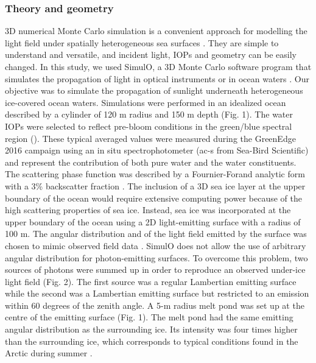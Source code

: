 \subsubsection{Theory and geometry}

3D numerical Monte Carlo simulation is a convenient approach for modelling the light field under spatially heterogeneous sea surfaces \citep{Mobley_ocean_optics_book, Petrich2012, Katlein2014, Katlein2016}. They are simple to understand and versatile, and incident light, IOPs and geometry can be easily changed. In this study, we used SimulO, a 3D Monte Carlo software program that simulates the propagation of light in optical instruments or in ocean waters \citep{Leymarie2010}. Our objective was to simulate the propagation of sunlight underneath heterogeneous ice-covered ocean waters. Simulations were performed in an idealized ocean described by a cylinder of 120 m radius and 150 m depth (Fig. 1). The water IOPs were selected to reflect pre-bloom conditions in the green/blue spectral region (\DIFdelbegin {}\DIFdelend \DIFaddbegin {}\DIFaddend \mminus{}). These typical averaged values were measured during the GreenEdge 2016 campaign using an in situ spectrophotometer (ac-s from Sea-Bird Scientific) and represent the contribution of both pure water and the water constituents. The scattering phase function was described by a Fournier-Forand analytic form with a 3\% backscatter fraction \citep{Fournier1994, Mobley2002}. The inclusion of a 3D sea ice layer at the upper boundary of the ocean would require extensive computing power because of the high scattering properties of sea ice. Instead, sea ice was incorporated at the upper boundary of the ocean using a 2D light-emitting surface with a radius of 100 m. The angular distribution and \DIFdelbegin {}\DIFdelend \DIFaddbegin {}\DIFaddend of the light field emitted by the surface was chosen to mimic observed field data \citep{Girard2018}. SimulO does not allow the use of arbitrary angular distribution for photon-emitting surfaces. To overcome this problem, two sources of photons were summed up in order to reproduce an observed under-ice light field (Fig. 2). The first source was a regular Lambertian emitting surface while the second was a Lambertian emitting surface but restricted to an emission within 60 degrees of the zenith angle. A 5-m radius melt pond was set up at the centre of the emitting surface (Fig. 1). The melt pond had the same emitting angular distribution as the surrounding ice. Its intensity was four times higher than the surrounding ice, which corresponds to typical conditions found in the Arctic during summer \citep{Perovich2016}.


